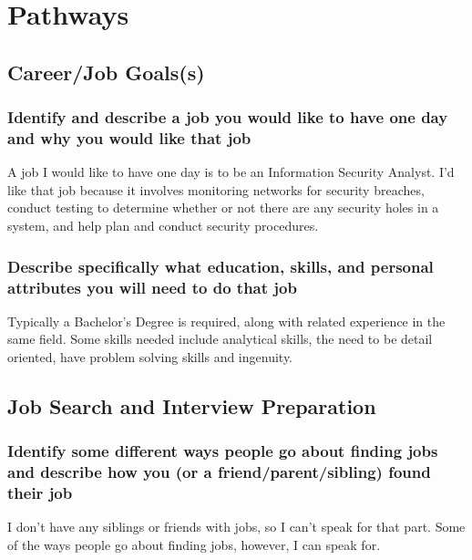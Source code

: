 \documentclass[11pt]{article}
\begin{document}
\section*{Pathways}
\label{sec:org4f399d1}
\subsection*{Career/Job Goals(s)}
\label{sec:org5990ca6}
\subsubsection*{Identify and describe a job you would like to have one day and why you would like that job}
\label{sec:orgef71641}

A job I would like to have one day is to be an Information Security Analyst. I'd like that job because it involves monitoring networks for security breaches, conduct testing to determine whether or not there are any security holes in a system, and help plan and conduct security procedures.

\subsubsection*{Describe specifically what education, skills, and personal attributes you will need to do that job}
\label{sec:org3139629}

Typically a Bachelor's Degree is required, along with related experience in the same field. Some skills needed include analytical skills, the need to be detail oriented, have problem solving skills and ingenuity. 

\subsection*{Job Search and Interview Preparation}
\label{sec:org368ad03}
\subsubsection*{Identify some different ways people go about finding jobs and describe how you (or a friend/parent/sibling) found their job}
\label{sec:org68d3026}

I don't have any siblings or friends with jobs, so I can't speak for that part. Some of the ways people go about finding jobs, however, I can speak for.
\end{document}
